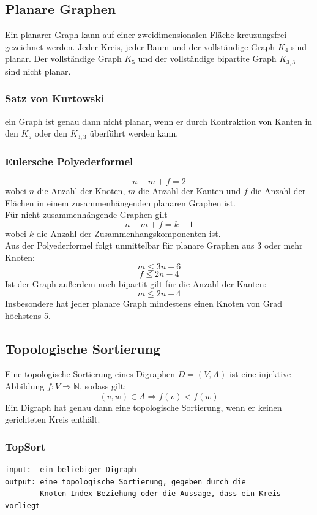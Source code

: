 \documentclass[10pt,a4paper,landscape]{article}
\begin{document}
\begin{multicols*}{2}
    \subsection{ Planare Graphen }
    Ein planarer Graph kann auf einer zweidimensionalen Fläche kreuzungsfrei gezeichnet werden. Jeder Kreis, 
    jeder Baum und der vollständige Graph $K_4$ sind planar. Der vollständige Graph $K_5$ und der vollständige 
    bipartite Graph $K_{3,3}$ sind nicht planar.
    \subsubsection*{ Satz von Kurtowski } ein Graph ist genau dann nicht planar, wenn er durch Kontraktion von Kanten 
    in den $K_5$ oder den $K_{3,3}$ überführt werden kann.
    \subsubsection*{ Eulersche Polyederformel }
    \[ n - m + f = 2 \]
    wobei $n$ die Anzahl der Knoten, $m$ die Anzahl der Kanten und $f$ die Anzahl der Flächen in einem 
    zusammenhängenden planaren Graphen ist. \\
    Für nicht zusammenhängende Graphen gilt
    \[ n - m + f = k + 1 \]
    wobei $k$ die Anzahl der Zusammenhangskomponenten ist. \\
    Aus der Polyederformel folgt unmittelbar für planare Graphen aus 3 oder mehr Knoten:
    \[ m \leq 3n - 6 \]
    \[ f \leq 2n - 4 \]
    Ist der Graph außerdem noch bipartit gilt für die Anzahl der Kanten:
    \[ m \leq 2n - 4 \]
    Insbesondere hat jeder planare Graph mindestens einen Knoten von Grad höchstens 5.

    \subsection{ Topologische Sortierung }
    Eine topologische Sortierung eines Digraphen $D = (V,A)$ ist eine injektive Abbildung 
    $f:V\Rightarrow \mathbb{N}$, sodass gilt:
    \[ (v,w)\in A \Rightarrow f(v) < f(w) \]
    Ein Digraph hat genau dann eine topologische Sortierung, wenn er keinen gerichteten Kreis enthält.
    \newpage
    \subsubsection*{ TopSort }
    \small
\begin{verbatim}
input:  ein beliebiger Digraph
output: eine topologische Sortierung, gegeben durch die 
        Knoten-Index-Beziehung oder die Aussage, dass ein Kreis vorliegt


\end{verbatim}
\end{multicols*}
\end{document}
